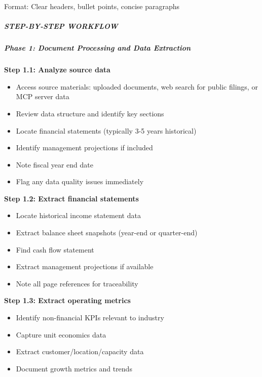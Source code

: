 \documentclass[11pt]{article}
\begin{document}
Format: Clear headers, bullet points, concise paragraphs


\subparagraph{STEP-BY-STEP WORKFLOW}\mbox{}\par

\subparagraph{Phase 1: Document Processing and Data Extraction}\mbox{}\par

\textbf{Step 1.1: Analyze source data}

\begin{itemize}[leftmargin=*,itemsep=2pt,topsep=2pt]
\item {} Access source materials: uploaded documents, web search for public filings, or MCP server data
\item {} Review data structure and identify key sections
\item {} Locate financial statements (typically 3-5 years historical)
\item {} Identify management projections if included
\item {} Note fiscal year end date
\item {} Flag any data quality issues immediately
\end{itemize}

\textbf{Step 1.2: Extract financial statements}

\begin{itemize}[leftmargin=*,itemsep=2pt,topsep=2pt]
\item {} Locate historical income statement data
\item {} Extract balance sheet snapshots (year-end or quarter-end)
\item {} Find cash flow statement
\item {} Extract management projections if available
\item {} Note all page references for traceability
\end{itemize}

\textbf{Step 1.3: Extract operating metrics}

\begin{itemize}[leftmargin=*,itemsep=2pt,topsep=2pt]
\item {} Identify non-financial KPIs relevant to industry
\item {} Capture unit economics data
\item {} Extract customer/location/capacity data
\item {} Document growth metrics and trends
\end{itemize}
\end{document}
